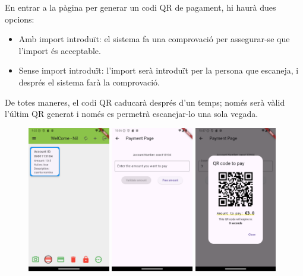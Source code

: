 \documentclass[a4paper,12pt,twoside]{ThesisStyle}
\begin{document}
En entrar a la pàgina per generar un codi QR de pagament, hi haurà dues opcions:

\begin{itemize} 
    \item Amb import introduït: el sistema fa una comprovació per assegurar-se que l'import és acceptable. 
    \item Sense import introduït: l'import serà introduït per la persona que escaneja, i després el sistema farà la comprovació. 
\end{itemize}

De totes maneres, el codi QR caducarà després d’un temps; només serà vàlid l'últim QR generat i només es permetrà escanejar-lo una sola vegada.


\begin{figure}[h]
    \centering
    \includegraphics[width=0.32\textwidth]{imatges/mainpageAccount2.png}
    \includegraphics[width=0.32\textwidth]{imatges/paymentPage.png}
    \includegraphics[width=0.32\textwidth]{imatges/paymentPageWithValue.png}

\end{figure}
\end{document}
